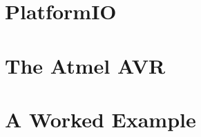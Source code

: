 
%
%


\part{PlatformIO}\label{part-platformio}




\part{The Atmel AVR}\label{part-atmel-avr}




%


\part{A Worked Example}\label{part-worked-example}



%
%
